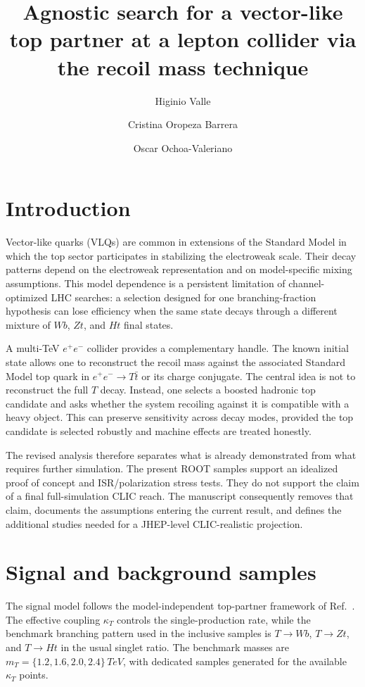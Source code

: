 \documentclass[a4paper,11pt]{article}
\title{Agnostic search for a vector-like top partner at a lepton collider via the recoil mass technique}
\author[a]{Higinio Valle}
\author[a]{Cristina Oropeza Barrera}
\author[a]{Oscar Ochoa-Valeriano}
\affiliation[a]{Universidad Iberoamericana Ciudad de Mexico,
Prolongacion Paseo de la Reforma 880, Col. Lomas de Santa Fe, Alvaro Obregon,
Mexico City 01219, Mexico}
\begin{document}
\maketitle
\flushbottom
\tableofcontents
\clearpage

\section{Introduction}

Vector-like quarks (VLQs) are common in extensions of the Standard Model in
which the top sector participates in stabilizing the electroweak scale.  Their
decay patterns depend on the electroweak representation and on model-specific
mixing assumptions.  This model dependence is a persistent limitation of
channel-optimized LHC searches: a selection designed for one branching-fraction
hypothesis can lose efficiency when the same state decays through a different
mixture of $Wb$, $Zt$, and $Ht$ final states.

A multi-TeV $e^+e^-$ collider provides a complementary handle.  The known
initial state allows one to reconstruct the recoil mass against the associated
Standard Model top quark in $e^+e^-\to T\bar t$ or its charge conjugate.  The
central idea is not to reconstruct the full $T$ decay.  Instead, one selects a
boosted hadronic top candidate and asks whether the system recoiling against it
is compatible with a heavy object.  This can preserve sensitivity across decay
modes, provided the top candidate is selected robustly and machine effects are
treated honestly.

The revised analysis therefore separates what is already demonstrated from what
requires further simulation.  The present ROOT samples support an idealized
proof of concept and ISR/polarization stress tests.  They do not support the
claim of a final full-simulation CLIC reach.  The manuscript consequently
removes that claim, documents the assumptions entering the current result, and
defines the additional studies needed for a JHEP-level CLIC-realistic
projection.

\section{Signal and background samples}
\label{sec:samples}

The signal model follows the model-independent top-partner framework of
Ref.~\cite{Buchkremer:2013bha}.  The effective coupling $\kappa_T$ controls the
single-production rate, while the benchmark branching pattern used in the
inclusive samples is $T\to Wb$, $T\to Zt$, and $T\to Ht$ in the usual singlet
ratio.  The benchmark masses are
$m_T=\{1.2,1.6,2.0,2.4\}\,\si{TeV}$, with dedicated samples generated for the
available $\kappa_T$ points.
\end{document}
